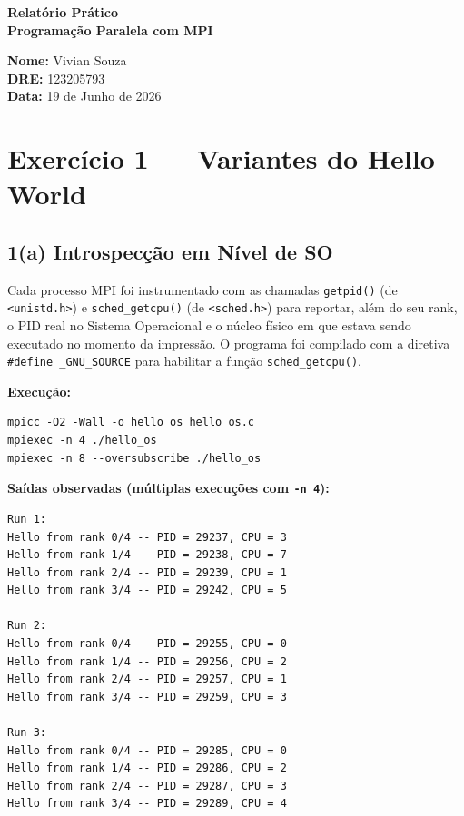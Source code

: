 \documentclass[12pt,a4paper]{article}
\begin{document}
\begin{titlepage}
  \centering
  \vspace*{3cm}
  {\LARGE\bfseries Relatório Prático\\[0.4em]
   Programação Paralela com MPI\par}
  \vspace{2cm}
  {\large
    \textbf{Nome:} Vivian Souza \\[0.5em]
    \textbf{DRE:} 123205793 \\[0.5em]
    \textbf{Data:} 19 de Junho de 2026
  }
  \vfill
\end{titlepage}

\tableofcontents
\newpage

\section{Exercício 1 — Variantes do Hello World}

\subsection{1(a) Introspecção em Nível de SO}

Cada processo MPI foi instrumentado com as chamadas \texttt{getpid()} (de \texttt{<unistd.h>}) e \texttt{sched\_getcpu()} (de \texttt{<sched.h>}) para reportar, além do seu rank, o PID real no Sistema Operacional e o núcleo físico em que estava sendo executado no momento da impressão. O programa foi compilado com a diretiva \texttt{\#define \_GNU\_SOURCE} para habilitar a função \texttt{sched\_getcpu()}.

\textbf{Execução:}
\begin{lstlisting}[style=shell]
mpicc -O2 -Wall -o hello_os hello_os.c
mpiexec -n 4 ./hello_os
mpiexec -n 8 --oversubscribe ./hello_os
\end{lstlisting}

\textbf{Saídas observadas (múltiplas execuções com \texttt{-n 4}):}

\begin{lstlisting}[style=shell]
Run 1:
Hello from rank 0/4 -- PID = 29237, CPU = 3
Hello from rank 1/4 -- PID = 29238, CPU = 7
Hello from rank 2/4 -- PID = 29239, CPU = 1
Hello from rank 3/4 -- PID = 29242, CPU = 5

Run 2:
Hello from rank 0/4 -- PID = 29255, CPU = 0
Hello from rank 1/4 -- PID = 29256, CPU = 2
Hello from rank 2/4 -- PID = 29257, CPU = 1
Hello from rank 3/4 -- PID = 29259, CPU = 3

Run 3:
Hello from rank 0/4 -- PID = 29285, CPU = 0
Hello from rank 1/4 -- PID = 29286, CPU = 2
Hello from rank 2/4 -- PID = 29287, CPU = 3
Hello from rank 3/4 -- PID = 29289, CPU = 4
\end{lstlisting}
\end{document}
